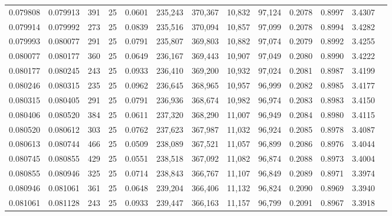 \begin{tabular}{rrrrrrrrrrrrr}
0.079808 & 0.079913 &   391 &  25 &                                     0.0601 & 235,243 & 370,367 &  10,832 &  97,124 & 0.2078 & 0.8997 & 3.4307 \\
0.079914 & 0.079992 &   273 &  25 &                                     0.0839 & 235,516 & 370,094 &  10,857 &  97,099 & 0.2078 & 0.8994 & 3.4282 \\
0.079993 & 0.080077 &   291 &  25 &                                     0.0791 & 235,807 & 369,803 &  10,882 &  97,074 & 0.2079 & 0.8992 & 3.4255 \\
0.080077 & 0.080177 &   360 &  25 &                                     0.0649 & 236,167 & 369,443 &  10,907 &  97,049 & 0.2080 & 0.8990 & 3.4222 \\
0.080177 & 0.080245 &   243 &  25 &                                     0.0933 & 236,410 & 369,200 &  10,932 &  97,024 & 0.2081 & 0.8987 & 3.4199 \\
0.080246 & 0.080315 &   235 &  25 &                                     0.0962 & 236,645 & 368,965 &  10,957 &  96,999 & 0.2082 & 0.8985 & 3.4177 \\
0.080315 & 0.080405 &   291 &  25 &                                     0.0791 & 236,936 & 368,674 &  10,982 &  96,974 & 0.2083 & 0.8983 & 3.4150 \\
0.080406 & 0.080520 &   384 &  25 &                                     0.0611 & 237,320 & 368,290 &  11,007 &  96,949 & 0.2084 & 0.8980 & 3.4115 \\
0.080520 & 0.080612 &   303 &  25 &                                     0.0762 & 237,623 & 367,987 &  11,032 &  96,924 & 0.2085 & 0.8978 & 3.4087 \\
0.080613 & 0.080744 &   466 &  25 &                                     0.0509 & 238,089 & 367,521 &  11,057 &  96,899 & 0.2086 & 0.8976 & 3.4044 \\
0.080745 & 0.080855 &   429 &  25 &                                     0.0551 & 238,518 & 367,092 &  11,082 &  96,874 & 0.2088 & 0.8973 & 3.4004 \\
0.080855 & 0.080946 &   325 &  25 &                                     0.0714 & 238,843 & 366,767 &  11,107 &  96,849 & 0.2089 & 0.8971 & 3.3974 \\
0.080946 & 0.081061 &   361 &  25 &                                     0.0648 & 239,204 & 366,406 &  11,132 &  96,824 & 0.2090 & 0.8969 & 3.3940 \\
0.081061 & 0.081128 &   243 &  25 &                                     0.0933 & 239,447 & 366,163 &  11,157 &  96,799 & 0.2091 & 0.8967 & 3.3918 \\

\end{tabular}
